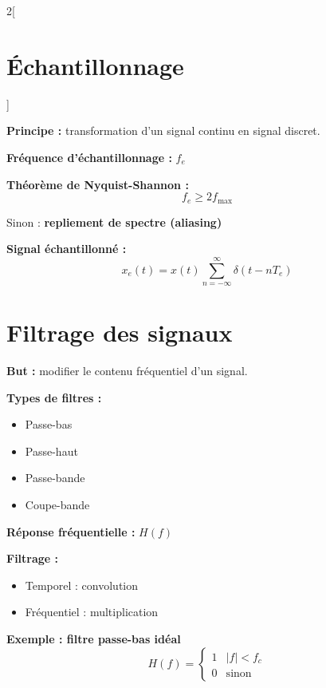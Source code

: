 \documentclass[a4paper,10pt]{article}
\begin{document}
    \begin{multicols}{2}[
    \section{Échantillonnage}
    ]

    \textbf{Principe :} transformation d'un signal continu en signal discret.

    \textbf{Fréquence d'échantillonnage :} $f_e$

    \textbf{Théorème de Nyquist-Shannon :}
    \[
    f_e \ge 2 f_{\max}
    \]

    Sinon : \textbf{repliement de spectre (aliasing)}

    \textbf{Signal échantillonné :}
    \[
    x_e(t) = x(t) \sum_{n=-\infty}^{\infty} \delta(t-nT_e)
    \]

    \section{Filtrage des signaux}

    \textbf{But :} modifier le contenu fréquentiel d'un signal.

    \textbf{Types de filtres :}
    \begin{itemize}
        \item Passe-bas
        \item Passe-haut
        \item Passe-bande
        \item Coupe-bande
    \end{itemize}

    \textbf{Réponse fréquentielle :} $H(f)$

    \textbf{Filtrage :}
    \begin{itemize}
        \item Temporel : convolution
        \item Fréquentiel : multiplication
    \end{itemize}

    \textbf{Exemple : filtre passe-bas idéal}
    \[
    H(f)=
    \begin{cases}
    1 & |f| < f_c \\
    0 & \text{sinon}
    \end{cases}
    \]
    
    \end{multicols}
\end{document}
